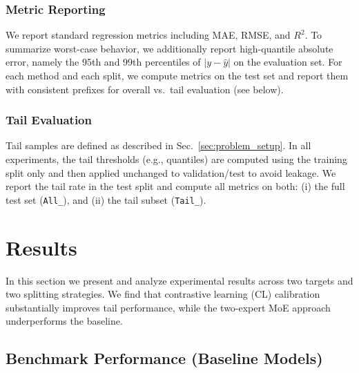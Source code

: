 \documentclass[pdflatex,sn-basic,Numbered]{sn-jnl}
\begin{document}
\subsubsection{Metric Reporting}
\label{sec:metric_reporting}
We report standard regression metrics including MAE, RMSE, and \(R^2\).
To summarize worst-case behavior, we additionally report high-quantile absolute error, namely the 95th and 99th percentiles of \(|y-\hat{y}|\) on the evaluation set.
For each method and each split, we compute metrics on the test set and report them with consistent prefixes for overall vs.\ tail evaluation (see below).

\subsubsection{Tail Evaluation}
\label{sec:tail_evaluation_protocol}
Tail samples are defined as described in Sec.~\ref{sec:problem_setup}. In all experiments, the tail thresholds (e.g., quantiles) are computed using the training split only and then applied unchanged to validation/test to avoid leakage.
We report the tail rate in the test split and compute all metrics on both:
(i) the full test set (\texttt{All\_}), and
(ii) the tail subset (\texttt{Tail\_}).



\section{Results}

In this section we present and analyze experimental results across two targets and two splitting strategies. We find that contrastive learning (CL) calibration substantially improves tail performance, while the two-expert MoE approach underperforms the baseline.

\subsection{Benchmark Performance (Baseline Models)}
\end{document}
